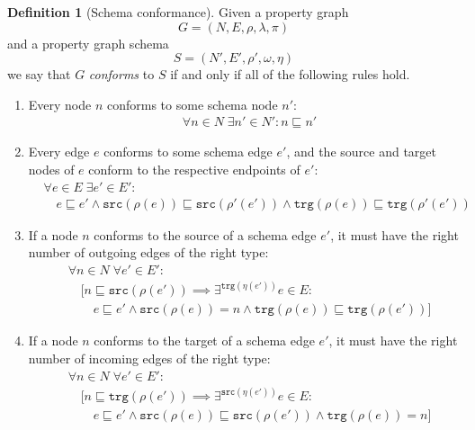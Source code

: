 \documentclass{report}
\theoremstyle{definition}
\newtheorem{definition}{Definition}
\newcommand{\src}{\mathtt{src}}
\newcommand{\trg}{\mathtt{trg}}
\newcommand{\conf}{\sqsubseteq}
\begin{document}
\begin{definition}[Schema conformance]
  \label{def:schema-conformance}
  Given a property graph $$G = (N, E, \rho, \lambda, \pi)$$ and a property graph schema $$S = (N', E', \rho', \omega, \eta)$$ we say that $G$ \emph{conforms} to $S$ if and only if all of the following rules hold.

  \begin{enumerate}
    \item\label{rule:node}
    Every node $n$ conforms to some schema node $n'$:
    \begin{align*}
       & \forall n \in N \; \exists n' \in N' : n \conf n'
    \end{align*}

    \item\label{rule:edge}
    Every edge $e$ conforms to some schema edge $e'$, and the source and target nodes of $e$ conform to the respective endpoints of $e'$:
    \begin{align*}
       & \forall e \in E \; \exists e' \in E' :                      \\
       & \quad e \conf e' \wedge \src(\rho(e)) \conf \src(\rho'(e'))
      \wedge \trg(\rho(e)) \conf \trg(\rho'(e'))
    \end{align*}

    \item\label{rule:out}
    If a node $n$ conforms to the source of a schema edge $e'$, it must have the right number of outgoing edges of the right type:
    \begin{align*}
       & \forall n \in N \; \forall e' \in E' :                                                        \\
       & \quad \big[n \conf \src(\rho(e')) \implies \exists^{\trg(\eta(e'))} e \in E :                 \\
       & \quad\quad e \conf e' \wedge \src(\rho(e)) = n \wedge \trg(\rho(e)) \conf \trg(\rho(e'))\big]
    \end{align*}

    \item\label{rule:in}
    If a node $n$ conforms to the target of a schema edge $e'$, it must have the right number of incoming edges of the right type:
    \begin{align*}
       & \forall n \in N \; \forall e' \in E' :                                                        \\
       & \quad \big[n \conf \trg(\rho(e')) \implies \exists^{\src(\eta(e'))} e \in E :                 \\
       & \quad\quad e \conf e' \wedge \src(\rho(e)) \conf \src(\rho(e')) \wedge \trg(\rho(e)) = n\big]
    \end{align*}
  \end{enumerate}
\end{definition}
\end{document}
